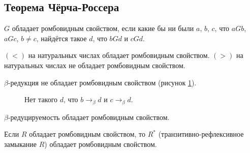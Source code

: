 \subsection{\texorpdfstring{Теорема Чёрча-Россера}{Church-Rosser theorem}}

\begin{definition}
    $G$ обладает ромбовидным свойством, если какие бы ни были $a$, $b$, $c$, что $aGb$, $aGc$, $b \ne c$, найдётся такое $d$, что $bGd$ и $cGd$.
\end{definition}

\begin{example}
    $(<)$ на натуральных числах обладает ромбовидным свойством.
    $(>)$ на натуральных числах не обладает ромбовидным свойством.

$\beta$-редукция не обладает ромбовидным свойством (рисунок \ref{no-diamond}).
\begin{figure}[ht]
    \centering
    \caption{Нет такого $d$, что $b \rightarrow_{\beta} d$ и $c \rightarrow_{\beta} d$.}
    \label{no-diamond}
\end{figure}
\end{example}

\begin{theorem} \label{church-rosser}
    $\beta$-редуцируемость обладает ромбовидным свойством.
\end{theorem}

\begin{lemma}
    Если $R$ обладает ромбовидным свойством, то $R^{*}$ (транзитивно-рефлексивное замыкание $R$) обладает ромбовидным свойством.
\end{lemma}

